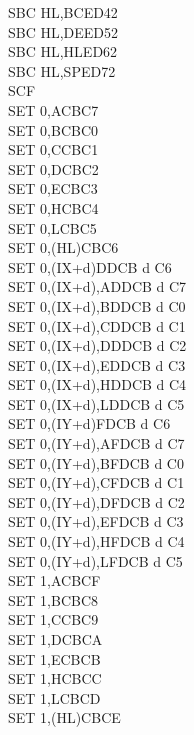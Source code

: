 \begin{multicols}{3}
{\begin{tabbing}
        SBC HL,BC\>ED42\\
        SBC HL,DE\>ED52\\
        SBC HL,HL\>ED62\\
        SBC HL,SP\>ED72\\
        SCF\\
        SET 0,A\>CBC7\\
        SET 0,B\>CBC0\\
        SET 0,C\>CBC1\\
        SET 0,D\>CBC2\\
        SET 0,E\>CBC3\\
        SET 0,H\>CBC4\\
        SET 0,L\>CBC5\\
        SET 0,(HL)\>CBC6\\
        SET 0,(IX+d)\>DDCB d C6\\
        SET 0,(IX+d),A\UNDOC\>DDCB d C7\\
        SET 0,(IX+d),B\UNDOC\>DDCB d C0\\
        SET 0,(IX+d),C\UNDOC\>DDCB d C1\\
        SET 0,(IX+d),D\UNDOC\>DDCB d C2\\
        SET 0,(IX+d),E\UNDOC\>DDCB d C3\\
        SET 0,(IX+d),H\UNDOC\>DDCB d C4\\
        SET 0,(IX+d),L\UNDOC\>DDCB d C5\\
        SET 0,(IY+d)\>FDCB d C6\\
        SET 0,(IY+d),A\UNDOC\>FDCB d C7\\
        SET 0,(IY+d),B\UNDOC\>FDCB d C0\\
        SET 0,(IY+d),C\UNDOC\>FDCB d C1\\
        SET 0,(IY+d),D\UNDOC\>FDCB d C2\\
        SET 0,(IY+d),E\UNDOC\>FDCB d C3\\
        SET 0,(IY+d),H\UNDOC\>FDCB d C4\\
        SET 0,(IY+d),L\UNDOC\>FDCB d C5\\
        SET 1,A\>CBCF\\
        SET 1,B\>CBC8\\
        SET 1,C\>CBC9\\
        SET 1,D\>CBCA\\
        SET 1,E\>CBCB\\
        SET 1,H\>CBCC\\
        SET 1,L\>CBCD\\
        SET 1,(HL)\>CBCE\\

\end{tabbing}}
\end{multicols}
